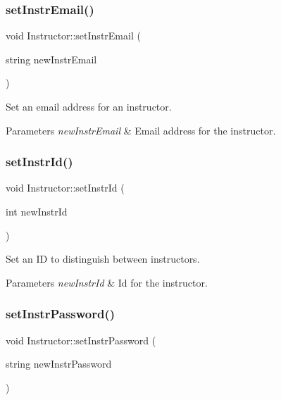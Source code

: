\subsubsection{\texorpdfstring{set\+Instr\+Email()}{setInstrEmail()}}
{\footnotesize\ttfamily void Instructor\+::set\+Instr\+Email (\begin{DoxyParamCaption}\item[{string}]{new\+Instr\+Email }\end{DoxyParamCaption})}

Set an email address for an instructor. 
\begin{DoxyParams}{Parameters}
{\em new\+Instr\+Email} & Email address for the instructor. \\
\hline
\end{DoxyParams}
\mbox{\label{classInstructor_ae19bf0bec8343a445da507d8b0cbfbea}} 
\subsubsection{\texorpdfstring{set\+Instr\+Id()}{setInstrId()}}
{\footnotesize\ttfamily void Instructor\+::set\+Instr\+Id (\begin{DoxyParamCaption}\item[{int}]{new\+Instr\+Id }\end{DoxyParamCaption})}

Set an ID to distinguish between instructors. 
\begin{DoxyParams}{Parameters}
{\em new\+Instr\+Id} & Id for the instructor. \\
\hline
\end{DoxyParams}
\mbox{\label{classInstructor_abbbe7c232169737566500946cfc52ec8}} 
\subsubsection{\texorpdfstring{set\+Instr\+Password()}{setInstrPassword()}}
{\footnotesize\ttfamily void Instructor\+::set\+Instr\+Password (\begin{DoxyParamCaption}\item[{string}]{new\+Instr\+Password }\end{DoxyParamCaption})}

